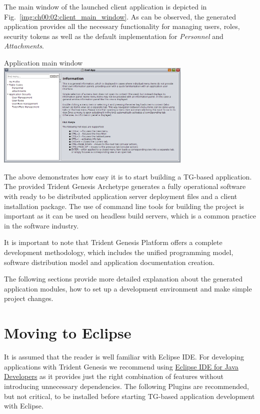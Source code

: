   The main window of the launched client application is depicted in Fig.~\ref{img:ch00:02:client_main_window}.
  As can be observed, the generated application provides all the necessary functionality for managing users, roles, security tokens as well as the default implementation for \emph{Personnel} and \emph{Attachments}.

  \begin{image}{Application main window}{\label{img:ch00:02:client_main_window}}    
    \includegraphics[width=0.7\textwidth]{parts/00-part/chapters/01-application-modules/images/05-client-main-window.png}
  \end{image}

  The above demonstrates how easy it is to start building a TG-based application.
  The provided Trident Genesis Archetype generates a fully operational software with ready to be distributed application server deployment files and a client installation package.
  The use of command line tools for building the project is important as it can be used on headless build servers, which is a common practice in the software industry.

  It is important to note that Trident Genesis Platform offers a complete development methodology, which includes the unified programming model, software distribution model and application documentation creation.
  
  The following sections provide more detailed explanation about the generated application modules, how to set up a development environment and make simple project changes.

\section{Moving to Eclipse}
  It is assumed that the reader is well familiar with Eclipse IDE.
  For developing applications with Trident Genesis we recommend using \href{http://www.eclipse.org/downloads}{Eclipse IDE for Java Developers} as it provides just the right combination of features without introducing unnecessary dependencies.
  The following Plugins are recommended, but not critical, to be installed before starting TG-based application development with Eclipse.


